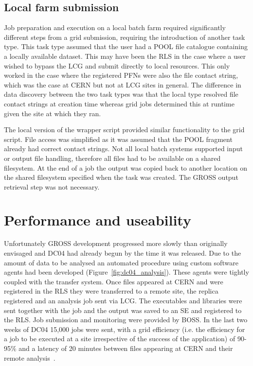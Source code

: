 \subsection{Local farm submission}
Job preparation and execution on a local batch farm required significantly different steps from a grid submission, requiring the introduction of another task type. This task type assumed that the user had a POOL file catalogue containing a locally available dataset. This may have been the RLS in the case where a user wished to bypass the LCG and submit directly to local resources. This only worked in the case where the registered PFNs were also the file contact string, which was the case at CERN but not at LCG sites in general. 
The difference in data discovery between the two task types was that the local type resolved file contact strings at creation time whereas grid jobs determined this at runtime given the site at which they ran.

The local version of the wrapper script provided similar functionality to the grid script. File access was simplified as it was assumed that the POOL fragment already had correct contact strings. Not all local batch systems supported input or output file handling, therefore all files had to be available on a shared filesystem. At the end of a job the output was copied back to another location on the shared filesystem specified when the task was created. The GROSS output retrieval step was not necessary.

\section{Performance and useability}
Unfortunately GROSS development progressed more slowly than originally envisaged and DC04 had already begun by the time it was released. Due to the amount of data to be analysed an automated procedure using custom software agents had been developed (Figure~\ref{fig:dc04_analysis}). These agents were tightly coupled with the transfer system. Once files appeared at CERN and were registered in the RLS they were transferred to a remote site, the replica registered and an analysis job sent via LCG. The executables and libraries were sent together with the job and the output was saved to an SE and registered to the RLS. Job submission and monitoring were provided by BOSS. In the last two weeks of DC04 15,000 jobs were sent, with a grid efficiency (i.e. the efficiency for a job to be executed at a site irrespective of the success of the application) of 90-95\% and a latency of 20 minutes between files appearing at CERN and their remote analysis~\cite{citeulike:621630, Fanfani:2004gh}.

